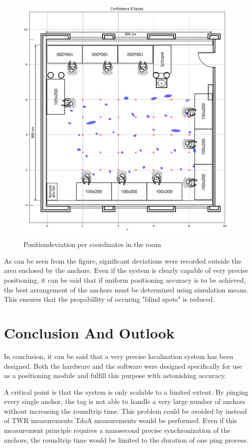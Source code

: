 \documentclass[conference, a4paper]{IEEEtran}
\begin{document}
\begin{figure}[hbt!]
	\centering
	\includegraphics[scale=0.35]{pic/position_plot.png}
	\caption{Positiondeviation per coordinates in the room}
\end{figure}

As can be seen from the figure, significant deviations were recorded outside the area enclosed by the anchors.
Even if the system is clearly capable of very precise positioning, it can be said that if uniform positioning accuracy is to be achieved,
the best arrangement of the anchors must be determined using simulation means.
This ensures that the propabillity of occuring "blind spots" is reduced.


\section{Conclusion And Outlook}\label{section:conclusion}
In conclusion, it can be said that a very precise localization system has been designed.
Both the hardware and the software were designed specifically for use as a positioning module and fulfill this purpose with astonishing accuracy.

A critical point is that the system is only scalable to a limited extent.
By pinging every single anchor, the tag is not able to handle a very large number of anchors without increasing the roundtrip time.
This problem could be avoided by instead of \ac{TWR} measurements \ac{TdoA} measurements would be performed.
Even if this measurement principle requires a nanosecond precise synchronization of the anchors,
the roundtrip time would be limited to the duration of one ping process.
\end{document}
